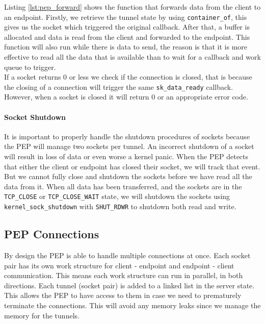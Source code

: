 \documentclass[a4paper,english, 11pt]{report}
\begin{document}
Listing \ref{lst:pep_forward} shows the function that forwards data from the client to an endpoint. Firstly, we retrieve the tunnel state by using \verb|container_of|, this gives us the socket which triggered the original callback. After that, a buffer is allocated and data is read from the client and forwarded to the endpoint. This function will also run while there is data to send, the reason is that it is more effective to read all the data that is available than to wait for a callback and work queue to trigger.\\

If a socket returns 0 or less we check if the connection is closed, that is because the closing of a connection will trigger the same \verb|sk_data_ready| callback. However, when a socket is closed it will return 0 or an appropriate error code.\\

\paragraph{Socket Shutdown}
It is important to properly handle the shutdown procedures of sockets because the PEP will manage two sockets per tunnel. An incorrect shutdown of a socket will result in loss of data or even worse a kernel panic. When the PEP detects that either the client or endpoint has closed their socket, we will track that event. But we cannot fully close and shutdown the sockets before we have read all the data from it. When all data has been transferred, and the sockets are in the \verb|TCP_CLOSE| or \verb|TCP_CLOSE_WAIT| state, we will shutdown the sockets using \verb|kernel_sock_shutdown| with \verb|SHUT_RDWR| to shutdown both read and write.\\

\subsection{PEP Connections}
By design the PEP is able to handle multiple connections at once. Each socket pair has its own work structure for client - endpoint and endpoint - client communication. This means each work structure can run in parallel, in both directions. Each tunnel (socket pair) is added to a linked list in the server state. This allows the PEP to have access to them in case we need to prematurely terminate the connections. This will avoid any memory leaks since we manage the memory for the tunnels.\\
\end{document}
